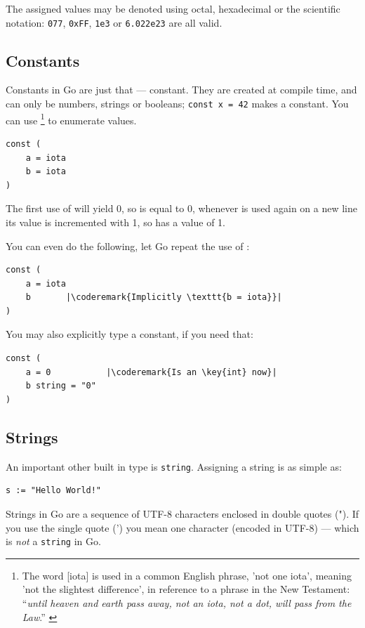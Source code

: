 \noindent{}

The assigned values may be denoted using octal, hexadecimal or the scientific notation:
\lstinline{077}, \lstinline{0xFF}, \lstinline{1e3} or
\mbox{\lstinline{6.022e23}} are all valid.

\subsection{Constants}
\label{sec:constants}
Constants in Go are just that --- constant. They are created at compile
time, and can only be numbers, strings or booleans;
\lstinline{const x = 42} makes  a constant. You can use
 \footnote{The word [iota] is used in a common English phrase,
'not one iota', meaning 'not the slightest difference', in reference to
a phrase in the New Testament: ``\emph{until heaven and earth pass away, not an
iota, not a dot, will pass from the Law}.'' \cite{iota}}
to enumerate values.
\begin{lstlisting}
const (
	a = iota
	b = iota 
)
\end{lstlisting}
The first use of  will yield 0, so  is equal to 0, whenever
 is used again on a new line its value is incremented with 1, so 
has a value of 1.

You can even do the following, let Go repeat the use of :
\begin{lstlisting}
const (
	a = iota
	b	    |\coderemark{Implicitly \texttt{b = iota}}|
)
\end{lstlisting}
You may also explicitly type a constant, if you need that:
\begin{lstlisting}
const (
	a = 0           |\coderemark{Is an \key{int} now}|
	b string = "0" 
)
\end{lstlisting}

\subsection{Strings}
An important other built in type is \lstinline{string}. Assigning a
string is as simple as:
\begin{lstlisting}
s := "Hello World!"
\end{lstlisting}
Strings in Go are a sequence of UTF-8 characters enclosed in double
quotes ("). If you use the single quote (') you mean one character
(encoded in UTF-8) --- which is \emph{not} a \lstinline{string} in Go.

